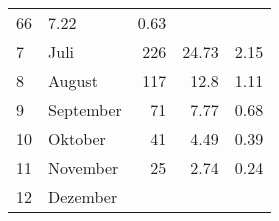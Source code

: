 \begin{longtable}{lXrrr}
       \num{66} &
       \num[round-mode=places,round-precision=2]{7,22} &
         \num[round-mode=places,round-precision=2]{0,63} \\

     7 &
     \multicolumn{1}{X}{ Juli   } &


       \num{226} &
       \num[round-mode=places,round-precision=2]{24,73} &
         \num[round-mode=places,round-precision=2]{2,15} \\

     8 &
     \multicolumn{1}{X}{ August   } &


       \num{117} &
       \num[round-mode=places,round-precision=2]{12,8} &
         \num[round-mode=places,round-precision=2]{1,11} \\

     9 &
     \multicolumn{1}{X}{ September   } &


       \num{71} &
       \num[round-mode=places,round-precision=2]{7,77} &
         \num[round-mode=places,round-precision=2]{0,68} \\

     10 &
     \multicolumn{1}{X}{ Oktober   } &


       \num{41} &
       \num[round-mode=places,round-precision=2]{4,49} &
         \num[round-mode=places,round-precision=2]{0,39} \\

     11 &
     \multicolumn{1}{X}{ November   } &


       \num{25} &
       \num[round-mode=places,round-precision=2]{2,74} &
         \num[round-mode=places,round-precision=2]{0,24} \\

     12 &
     \multicolumn{1}{X}{ Dezember   } &



\end{longtable}
